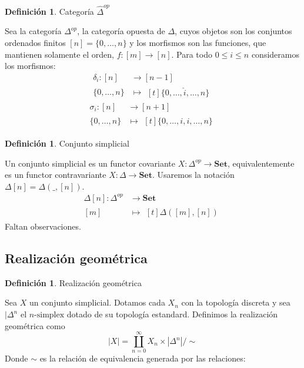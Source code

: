 \documentclass[11pt,a4paper,openright,oneside]{article}
\numberwithin{equation}{section}
\theoremstyle{definition}
\newtheorem{defi}[teo]{Definici\'on}
\begin{document}
\begin{defi}
    Categor\'ia $\hat{\Delta}^{op}$
\end{defi}
Sea la categor\'ia $\Delta^{op}$, la categor\'ia opuesta de $\Delta$, cuyos objetos son los conjuntos ordenados finitos $[n] = \{0,\dots,n\}$ y los morfismos son las funciones, que mantienen solamente el orden, $f: [m] \longrightarrow [n]$.
Para todo $0\le i \le n$ consideramos los morfismos:
\begin{align*}
    \delta_i: [n] & \longrightarrow [n-1] \\
    \{0,\dots,n\} & \longmapsto\!
    \begin{aligned}[t]
        \{0,\dots, \hat{i}, \dots,n\}
    \end{aligned}
\end{align*}
\begin{align*}
    \sigma_i: [n] & \longrightarrow [n+1] \\
    \{0,\dots,n\} & \longmapsto\!
    \begin{aligned}[t]
        \{0,\dots, i,i, \dots,n\}
    \end{aligned}
\end{align*}

\begin{defi}
    Conjunto simplicial
\end{defi}
Un conjunto simplicial es un functor covariante $X: \Delta^{op} \longrightarrow \mathbf{Set}$, equivalentemente es un functor contravariante $X: \Delta \longrightarrow \mathbf{Set}$.
Usaremos la notaci\'on $\Delta[n]=\Delta(\_,[n])$.
\begin{align*}
    \Delta[n]: \Delta^{op} & \longrightarrow \mathbf{Set} \\
    [m]                    & \longmapsto\!
    \begin{aligned}[t]
        \Delta([m],[n])
    \end{aligned}
\end{align*}
Faltan observaciones.

\subsection{Realizaci\'on geom\'etrica}
\begin{defi}
    Realizaci\'on geom\'etrica
\end{defi}
Sea $X$ un conjunto simplicial. Dotamos cada $X_n$ con la topolog\'ia discreta y sea $|\Delta^n$ el $n\text{-simplex}$ dotado de su topolog\'ia estandard. Definimos la realizaci\'on geom\'etrica como
$$
    |X| = \coprod_{n=0}^{\infty}X_n \times |\Delta^n| / \sim
$$
Donde $\sim$ es la relaci\'on de equivalencia generada por las relaciones:
\end{document}
